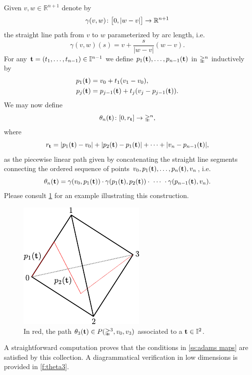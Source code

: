 Given $v,w \in \mathbb{R}^{n+1}$ denote by
\[
\gamma(v,w) \colon \big[0, \lvert w-v\rvert\big] \to \mathbb{R}^{n+1}
\]
the straight line path from $v$ to $w$ parameterized by arc length, i.e.
\[
\gamma(v,w)(s) = v + \frac{s}{|w-v|}(w-v).
\]
For any $\mathbf{t}=(t_1, \dots, t_{n-1}) \in \mathbb{I}^{n-1}$ we define $p_1(\mathbf{t}), \dots, p_{n-1}(\mathbf{t})$ in $\mathbb{\Delta}^n$ inductively by
\[
\begin{split}
	p_1(\mathbf{t}) &= v_0+ t_1(v_1-v_0), \\
	p_j(\mathbf{t}) &= p_{j-1}(\mathbf{t}) + t_j(v_j-p_{j-1}(\mathbf{t})).
\end{split}
\]
We may now define
\[
\theta_n(\mathbf{t}) \colon [0, r_{\mathbf{t}}] \to \mathbb{\Delta}^n,
\]
where
\[
r_{\mathbf{t}} = \lvert p_1(\mathbf{t})-v_0\rvert + \lvert p_2(\mathbf{t})-p_1(\mathbf{t})\rvert + \dots + \lvert v_n-p_{n-1}(\mathbf{t})\rvert,
\]
as the piecewise linear path given by concatenating the straight line segments connecting the ordered sequence of points $v_0, p_1(\mathbf{t}), \dots, p_n(\mathbf{t}), v_n$, i.e.
\[
\theta_n(\bft) =
\gamma(v_0,p_1(\bft)) \cdot \gamma(p_1(\bft), p_2(\bft)) \cdot\ \dotsb\ \cdot \gamma(p_{n-1}(\bft),v_n).
\]
Please consult \cref{f:theta1} for an example illustrating this construction.

\begin{figure}
	\centering
	\includegraphics[scale=1]{aux/theta1.pdf}
	\caption{In red, the path $\theta_3(\mathbf{t}) \in P(\mathbb{\Delta}^3, v_0, v_3)$ associated to a $\mathbf{t} \in \mathbb{I}^2$.}
	\label{f:theta1}
\end{figure}

A straightforward computation proves that the conditions in \cref{ss:adams maps} are satisfied by this collection.
A diagrammatical verification in low dimensions is provided in \cref{f:theta3}.

